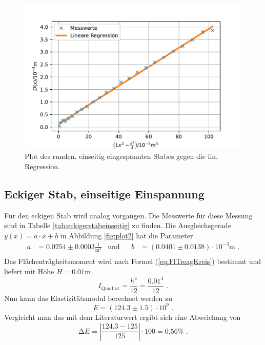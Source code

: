 \begin{figure}[H]
  \centering
  \includegraphics{pictures/Lineare Regression1.pdf}
  \caption{Plot des runden, einseitig eingespannten Stabes gegen die lin. Regression.}
  \label{fig:plot1}
\end{figure}

\subsection{Eckiger Stab, einseitige Einspannung}

Für den eckigen Stab wird analog vorgangen.
Die Messwerte für diese Messung sind in Tabelle \ref{tab:eckigerstabeinseitig} zu finden.
Die Ausgleichsgerade $y(x) = a \cdot x + b$ in Abbildung \ref{fig:plot2} hat die Parameter
\begin{align*}
  a &= 0.0254 ± 0.0003 \frac{1}{\unit{\meter\squared}} & \text{und}& & b&= (0.0401 ± 0.0138) \cdot 10^{-3} \unit\meter \text{ .} \\
\end{align*}
Das Flächenträgheitsmoment wird nach Formel (\ref{eq:FlTreagKreis}) bestimmt und liefert mit Höhe $H = 0.01 \unit\meter$
\begin{equation*}
  I_\text{Quadrat} = \frac{h^4} {12} = \frac{0.01^4} {12} \text{ .}
\end{equation*}
Nun kann das Elastizitätsmodul berechnet werden zu
\begin{equation*}
  E = (124.3 \pm 1.5) \cdot 10^{9} \text{ .}
\end{equation*}
Vergleicht man das mit dem Literaturwert ergibt sich eine Abweichung von
\begin{equation*}
  \increment E = \left|\frac{124.3 - 125}{125}\right| \cdot 100 = 0.56 \% \text{ .}
\end{equation*}




